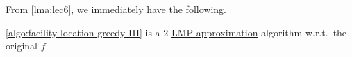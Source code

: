 From \autoref{lma:lec6}, we immediately have the following.

\begin{theorem}
	\autoref{algo:facility-location-greedy-III} is a \(2\)-\hyperref[def:LMP]{LMP approximation} algorithm w.r.t.\ the original \(f\).
\end{theorem}